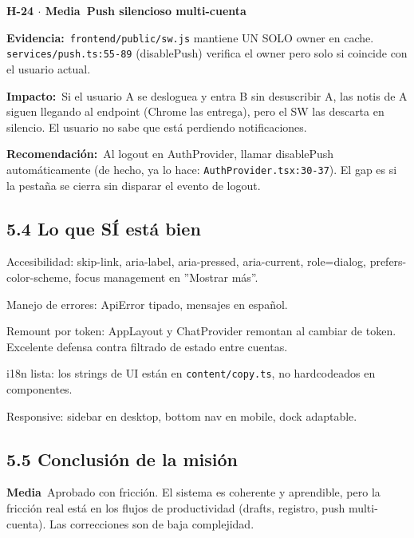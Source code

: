 \documentclass[10pt,a4paper]{article}
\newcommand{\code}[1]{\nolinkurl{#1}}
\newcommand{\badgeMedia}{\colorbox{yellow!35}{\textcolor{brown!90!black}{\textbf{\footnotesize Media}}}}
\begin{document}
\vspace{0.8em}\noindent\textbf{\large H-24 $\cdot$ \badgeMedia\  Push silencioso multi-cuenta}\par\vspace{0.3em}
\noindent\textbf{Evidencia:}\ \code{frontend/public/sw.js} mantiene UN SOLO owner en cache. \code{services/push.ts:55-89} (disablePush) verifica el owner pero solo si coincide con el usuario actual.\par\vspace{0.4em}
\noindent\textbf{Impacto:}\ Si el usuario A se desloguea y entra B sin desuscribir A, las notis de A siguen llegando al endpoint (Chrome las entrega), pero el SW las descarta en silencio. El usuario no sabe que está perdiendo notificaciones.\par\vspace{0.4em}
\noindent\textbf{Recomendación:}\ Al logout en AuthProvider, llamar disablePush automáticamente (de hecho, ya lo hace: \code{AuthProvider.tsx:30-37}). El gap es si la pestaña se cierra sin disparar el evento de logout.\par\vspace{0.4em}
\subsection{5.4 Lo que SÍ está bien}
Accesibilidad: skip-link, aria-label, aria-pressed, aria-current, role=dialog, prefers-color-scheme, focus management en ''Mostrar más''.\par\vspace{0.4em}
Manejo de errores: ApiError tipado, mensajes en español.\par\vspace{0.4em}
Remount por token: AppLayout y ChatProvider remontan al cambiar de token. Excelente defensa contra filtrado de estado entre cuentas.\par\vspace{0.4em}
i18n lista: los strings de UI están en \code{content/copy.ts}, no hardcodeados en componentes.\par\vspace{0.4em}
Responsive: sidebar en desktop, bottom nav en mobile, dock adaptable.\par\vspace{0.4em}
\subsection{5.5 Conclusión de la misión}
\badgeMedia\  Aprobado con fricción. El sistema es coherente y aprendible, pero la fricción real está en los flujos de productividad (drafts, registro, push multi-cuenta). Las correcciones son de baja complejidad.\par\vspace{0.4em}
\end{document}
